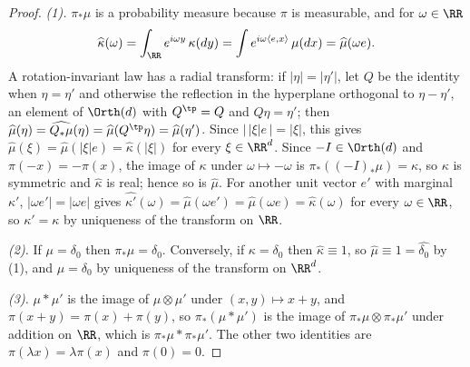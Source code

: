 \begin{proof}
\leanok
\emph{(1).} $\pi_*\mu$ is a probability measure because $\pi$ is measurable, and for $\omega \in \RR$
\[
  \widehat\kappa(\omega) = \int_{\RR} e^{i\omega y}\,\kappa(dy)
   = \int e^{i\omega\langle e, x\rangle}\,\mu(dx) = \widehat\mu(\omega e) .
\]
A rotation-invariant law has a radial transform: if $|\eta| = |\eta'|$, let $Q$ be the identity when
$\eta = \eta'$ and otherwise the reflection in the hyperplane orthogonal to $\eta - \eta'$, an
element of $\Orth(d)$ with $Q^{\tp} = Q$ and $Q\eta = \eta'$; then
$\widehat\mu(\eta) = \widehat{Q_*\mu}(\eta) = \widehat\mu(Q^{\tp}\eta) = \widehat\mu(\eta')$.
Since $|\,|\xi|e\,| = |\xi|$, this gives $\widehat\mu(\xi) = \widehat\mu(|\xi|e) =
\widehat\kappa(|\xi|)$ for every $\xi \in \RR^d$. Since $-I \in \Orth(d)$ and $\pi(-x) = -\pi(x)$,
the image of $\kappa$ under $\omega \mapsto -\omega$ is $\pi_*((-I)_*\mu) = \kappa$, so $\kappa$ is
symmetric and $\widehat\kappa$ is real; hence so is $\widehat\mu$. For another unit vector $e'$ with
marginal $\kappa'$, $|\omega e'| = |\omega e|$ gives $\widehat{\kappa'}(\omega) = \widehat\mu(\omega e')
= \widehat\mu(\omega e) = \widehat\kappa(\omega)$ for every $\omega \in \RR$, so $\kappa' = \kappa$
by uniqueness of the transform on $\RR$.

\emph{(2).} If $\mu = \delta_0$ then $\pi_*\mu = \delta_0$. Conversely, if $\kappa = \delta_0$ then
$\widehat\kappa \equiv 1$, so $\widehat\mu \equiv 1 = \widehat{\delta_0}$ by (1), and
$\mu = \delta_0$ by uniqueness of the transform on $\RR^d$.

\emph{(3).} $\mu * \mu'$ is the image of $\mu \otimes \mu'$ under $(x,y) \mapsto x + y$, and
$\pi(x+y) = \pi(x) + \pi(y)$, so $\pi_*(\mu * \mu')$ is the image of $\pi_*\mu \otimes \pi_*\mu'$
under addition on $\RR$, which is $\pi_*\mu * \pi_*\mu'$. The other two identities are
$\pi(\lambda x) = \lambda\pi(x)$ and $\pi(0) = 0$.
\end{proof}

